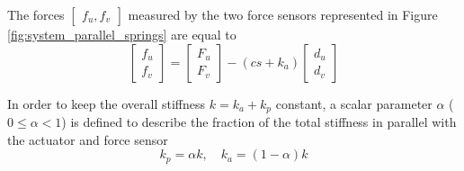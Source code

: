 \documentclass{ISMA_USD2020}
\begin{document}
\par
The forces \(\begin{bmatrix}f_u, f_v\end{bmatrix}\) measured by the two force sensors represented in Figure \ref{fig:system_parallel_springs} are equal to
\begin{equation}
\label{eq:measured_force_kp}
  \begin{bmatrix} f_{u} \\ f_{v} \end{bmatrix} =
  \begin{bmatrix} F_u \\ F_v \end{bmatrix} - (c s + k_a)
  \begin{bmatrix} d_u \\ d_v \end{bmatrix}
\end{equation}

In order to keep the overall stiffness \(k = k_a + k_p\) constant, a scalar parameter \(\alpha\) (\(0 \le \alpha < 1\)) is defined to describe the fraction of the total stiffness in parallel with the actuator and force sensor
\begin{equation}
  k_p = \alpha k, \quad k_a = (1 - \alpha) k
\end{equation}
\end{document}
